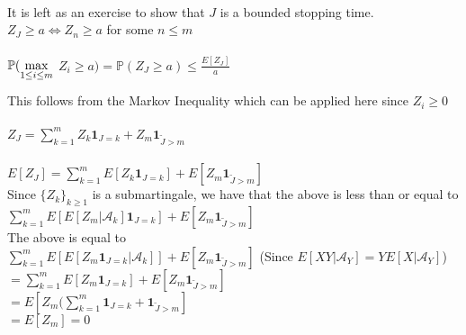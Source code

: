 \documentclass[main]{subfiles}
\begin{document}
    \\It is left as an exercise to show that $J$ is a bounded stopping time. $Z_{J} \geq a \Leftrightarrow Z_{n} \geq a$ for some $n \leq m$
    \\
    \\$\mathbb{P}(\smash{\displaystyle\max_{1 \leq i \leq m}}$ \space $Z_{i} \geq a) =\mathbb{P}(Z_{J} \geq a) \leq \frac{E[Z_{J}]}{a}$
\\
\\This follows from the Markov Inequality which can be applied here since $Z_{i} \geq 0$
\\
\\$Z_{J} = \sum_{k=1} ^{m} Z_{k} \mathbf{1}_{J=k} + Z_{m} \mathbf{1}_{\tilde{J}>m}$
    \\
    \\$E[Z_{J}] = \sum_{k=1} ^{m} E[Z_{k} \mathbf{1}_{J=k}] + E[Z_{m} \mathbf{1}_{\tilde{J}>m}]$
\\Since $\{Z_{k}\}_{k \geq 1}$ is a submartingale, we have that the above is less than or equal to
\\$ \sum_{k=1} ^{m} E[E[Z_{m}|\mathcal{A}_{k}]\mathbf{1}_{J=k}] + E[Z_{m} \mathbf{1}_{\tilde{J}>m}]$
    \\The above is equal to
    \\ $\sum_{k=1} ^{m} E[E[Z_{m}\mathbf{1}_{J=k}|\mathcal{A}_{k}]] + E[Z_{m} \mathbf{1}_{\tilde{J}>m}]$ (Since $E[XY|\mathcal{A}_{Y}] = YE[X|\mathcal{A}_{Y}]$)
    \\$=\sum_{k=1} ^{m} E[Z_{m} \mathbf{1}_{J=k}] + E[Z_{m} \mathbf{1}_{\tilde{J}>m}]$
\\$=E[Z_{m} (\sum_{k=1} ^{m} \mathbf{1}_{J=k} + \mathbf{1}_{\tilde{J}>m}]$
    \\$=E[Z_{m}]=0$ \space
\\
\\
\\
\end{document}

